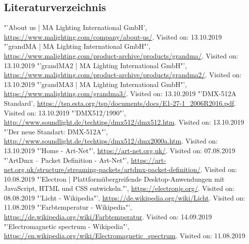 \documentclass[11pt]{scrartcl}
\begin{document}
{\subsection{Literaturverzeichnis}
\begingroup
\renewcommand{\section}[2]{}
\begin{thebibliography}{xxxxxxxxxxxxxxxxxxx}
    "'About us | MA Lighting International GmbH', \url{https://www.malighting.com/company/about-us/}. Visited on: 13.10.2019
    "'grandMA | MA Lighting International GmbH"', \url{https://www.malighting.com/product-archive/products/grandma/}. Visited on: 13.10.2019
    "'grandMA2 | MA Lighting International GmbH"', \url{https://www.malighting.com/product-archive/products/grandma2/}. Visited on: 13.10.2019
    "'grandMA3 | MA Lighting International GmbH"', \url{https://www.malighting.com/grandma3/}. Visited on: 13.10.2019
    "'DMX-512A Standard', \url{https://tsp.esta.org/tsp/documents/docs/E1-27-1_2006R2016.pdf}. Visited on: 13.10.2019
    "'DMX512/1990"', \url{http://www.soundlight.de/techtips/dmx512/dmx512.htm}. Visited on: 13.10.2019
    "'Der neue Standart: DMX-512A"', \url{http://www.soundlight.de/techtips/dmx512/dmx2000a.htm}. Visited on: 13.10.2019
    "'Home - Art-Net"', \url{https://art-net.org.uk/}. Visited on: 07.08.2019
    "'ArtDmx – Packet Definition - Art-Net"', \url{https://art-net.org.uk/structure/streaming-packets/artdmx-packet-definition/}. Visited on: 10.08.2019
    "'Electron | Plattformübergreifende Desktop-Anwendungen mit JavaScript, HTML und CSS entwickeln."', \url{https://electronjs.org/}. Visited on: 08.08.2019
    "'Licht - Wikipedia"', \url{https://de.wikipedia.org/wiki/Licht}. Visited on: 11.08.2019
    "'Farbtemperatur - Wikipedia"', \url{https://de.wikipedia.org/wiki/Farbtemperatur}. Visited on: 14.09.2019
    "'Electromagnetic spectrum - Wikipedia"', \url{https://en.wikipedia.org/wiki/Electromagnetic_spectrum}. Visited on: 11.08.2019

\end{thebibliography}}
\end{document}
